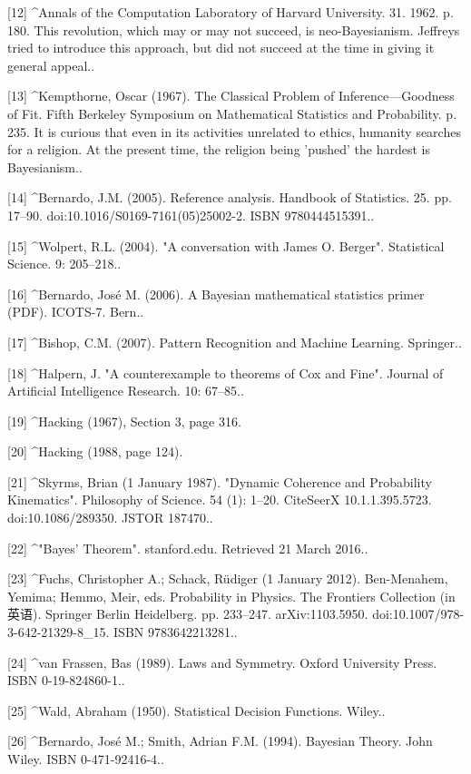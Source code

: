 [12]
^Annals of the Computation Laboratory of Harvard University. 31. 1962. p. 180. This revolution, which may or may not succeed, is neo-Bayesianism. Jeffreys tried to introduce this approach, but did not succeed at the time in giving it general appeal..

[13]
^Kempthorne, Oscar (1967). The Classical Problem of Inference—Goodness of Fit. Fifth Berkeley Symposium on Mathematical Statistics and Probability. p. 235. It is curious that even in its activities unrelated to ethics, humanity searches for a religion. At the present time, the religion being 'pushed' the hardest is Bayesianism..

[14]
^Bernardo, J.M. (2005). Reference analysis. Handbook of Statistics. 25. pp. 17–90. doi:10.1016/S0169-7161(05)25002-2. ISBN 9780444515391..

[15]
^Wolpert, R.L. (2004). "A conversation with James O. Berger". Statistical Science. 9: 205–218..

[16]
^Bernardo, José M. (2006). A Bayesian mathematical statistics primer (PDF). ICOTS-7. Bern..

[17]
^Bishop, C.M. (2007). Pattern Recognition and Machine Learning. Springer..

[18]
^Halpern, J. "A counterexample to theorems of Cox and Fine". Journal of Artificial Intelligence Research. 10: 67–85..

[19]
^Hacking (1967), Section 3, page 316.

[20]
^Hacking (1988, page 124).

[21]
^Skyrms, Brian (1 January 1987). "Dynamic Coherence and Probability Kinematics". Philosophy of Science. 54 (1): 1–20. CiteSeerX 10.1.1.395.5723. doi:10.1086/289350. JSTOR 187470..

[22]
^"Bayes' Theorem". stanford.edu. Retrieved 21 March 2016..

[23]
^Fuchs, Christopher A.; Schack, Rüdiger (1 January 2012). Ben-Menahem, Yemima; Hemmo, Meir, eds. Probability in Physics. The Frontiers Collection (in 英语). Springer Berlin Heidelberg. pp. 233–247. arXiv:1103.5950. doi:10.1007/978-3-642-21329-8_15. ISBN 9783642213281..

[24]
^van Frassen, Bas (1989). Laws and Symmetry. Oxford University Press. ISBN 0-19-824860-1..

[25]
^Wald, Abraham (1950). Statistical Decision Functions. Wiley..

[26]
^Bernardo, José M.; Smith, Adrian F.M. (1994). Bayesian Theory. John Wiley. ISBN 0-471-92416-4..

